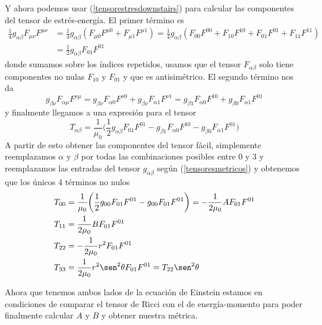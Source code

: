 Y ahora podemos usar (\ref{tensorestresdownstairs}) para calcular las componentes del tensor de estrés-energía. El primer término es
\begin{equation*}
\begin{split}
\frac{1}{4}g_{\alpha\beta}F_{\mu\nu}F^{\mu\nu} &= \frac{1}{4}g_{\alpha\beta}(F_{\mu 0}F^{\mu0} + F_{\mu 1}F^{\mu1})= \frac{1}{4}g_{\alpha\beta}(F_{00}F^{00} + F_{10}F^{10} + F_{0 1}F^{01}+ F_{11}F^{11}) \\
&= \frac{1}{2}g_{\alpha\beta}F_{0 1}F^{01}
\end{split}
\end{equation*}
donde sumamos sobre los índices repetidos, usamos que el tensor $F_{\alpha\beta}$ solo tiene componentes no nulas $F_{10}$ y $F_{01}$ y que es antisimétrico. El segundo término nos da
\begin{equation}
g_{\beta\nu}F_{\alpha\mu}F^{\nu\mu} = g_{\beta\nu}F_{\alpha 0}F^{\nu 0} + g_{\beta\nu}F_{\alpha 1}F^{\nu 1} = g_{\beta 1}F_{\alpha 0}F^{10} + g_{\beta 0}F_{\alpha 1}F^{01}
\end{equation}
y finalmente llegamos a una expresión para el tensor
\begin{equation}
T_{\alpha\beta} = \frac{1}{\mu_0}\biggr(\frac{1}{2}g_{\alpha\beta}F_{0 1}F^{01} - g_{\beta 1}F_{\alpha 0}F^{10} - g_{\beta 0}F_{\alpha 1}F^{01}\biggr)
\end{equation}
A partir de esto obtener las componentes del tensor fácil, simplemente reemplazamos $\alpha$ y $\beta$ por todas las combinaciones posibles entre $0$ y $3$ y reemplazamos las entradas del tensor $g_{\alpha\beta}$ según (\ref{tensoresmetricos}) y obtenemos que los únicos 4 términos no nulos 
\begin{equation}
\begin{split}
T_{00} &= \frac{1}{\mu_0}\biggr(\frac{1}{2}g_{00}F_{01}F^{01} - g_{00}F_{01}F^{01}\biggr)= -\frac{1}{2\mu_0}AF_{01}F^{01}\\
T_{11} &=\frac{1}{2\mu_0}B F_{01}F^{01}\\
T_{22} &= -\frac{1}{2\mu_0}r^2 F_{01}F^{01} \\
T_{33} &= \frac{1}{2\mu_0}r^2 \sen^2{\theta} F_{01}F^{01} = T_{22}\sen^2{\theta}
\end{split}
\label{componentestensorestresenergia}
\end{equation}

Ahora que tenemos ambos lados de la ecuación de Einstein estamos en condiciones de comparar el tensor de Ricci con el de energía-momento para poder finalmente calcular $A$ y $B$ y obtener nuestra métrica.

